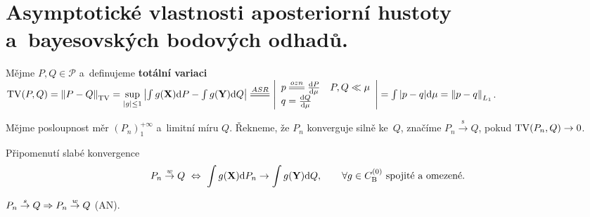 \chapter{Asymptotické vlastnosti aposteriorní hustoty a~bayesovských bodových odhadů.}

\begin{define}
	Mějme $P,Q\in\mathcal{P}$ a~definujeme \textbf{totální variaci} $\TV(P,Q)=\left\|P-Q\right\|_\TV=\sup\limits_{|g|\leq 1}\left| \int g(\X)\d P-\int g(\Y)\d Q \right|\equal{ASR}\left|\begin{array}{l}
	p\equal{ozn}\frac{\d P}{\d \mu}\quad P,Q\ll\mu\\ q=\frac{\d Q}{\d \mu}
	\end{array}
	\right|=\int |p-q|\d\mu=\left\|p-q\right\|_{L_1}$.
\end{define}
\begin{define}
	Mějme posloupnost měr $(P_n)_1^{+\infty}$ a~limitní míru $Q$. Řekneme, že $P_n$ konverguje silně ke~$Q$, značíme $P_n\stackrel{\text{s}}{\rightarrow}Q$, pokud $\mathrm{TV}(P_n,Q)\to0$.
\end{define}
\begin{remark}{Připomenutí slabé konvergence}
	$$ P_n\stackrel{w}{\to} Q~\Leftrightarrow~\int g(\textbf{X})\mathrm{d} P_n\to\int g(\textbf{Y})\mathrm{d} Q,\qquad \forall g\in C_\mathrm{B}^{(0)}\text{ spojité a~omezené.}$$
\end{remark}

\begin{theorem}
	$P_n\stackrel{s}{\to}Q\Rightarrow P_n\stackrel{w}{\to} Q$ (AN).
\end{theorem}

